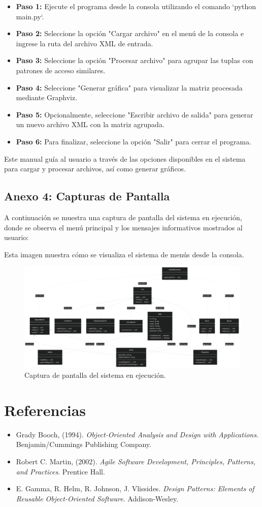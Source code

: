 \documentclass[letterpaper,12pt]{article}
\begin{document}
\begin{multicols}{2}
    \begin{itemize}
        \item \textbf{Paso 1:} Ejecute el programa desde la consola utilizando el comando `python main.py`.
        \item \textbf{Paso 2:} Seleccione la opción "Cargar archivo" en el menú de la consola e ingrese la ruta del archivo XML de entrada.
        \item \textbf{Paso 3:} Seleccione la opción "Procesar archivo" para agrupar las tuplas con patrones de acceso similares.
        \item \textbf{Paso 4:} Seleccione "Generar gráfica" para visualizar la matriz procesada mediante Graphviz.
        \item \textbf{Paso 5:} Opcionalmente, seleccione "Escribir archivo de salida" para generar un nuevo archivo XML con la matriz agrupada.
        \item \textbf{Paso 6:} Para finalizar, seleccione la opción "Salir" para cerrar el programa.
    \end{itemize}

    Este manual guía al usuario a través de las opciones disponibles en el sistema para cargar y procesar archivos, así como generar gráficos.

    \subsection*{Anexo 4: Capturas de Pantalla}
    A continuación se muestra una captura de pantalla del sistema en ejecución, donde se observa el menú principal y los mensajes informativos mostrados al usuario:

    Esta imagen muestra cómo se visualiza el sistema de menús desde la consola.

    \begin{figure}[H]
        \centering
        \includegraphics[width=0.2\columnwidth]{images/diagram.png}
        \caption{Captura de pantalla del sistema en ejecución.}
        \label{fig:diagram}
    \end{figure}


    \section*{Referencias}
    \begin{itemize}
        \item Grady Booch, (1994). \textit{Object-Oriented Analysis and Design with Applications}. Benjamin/Cummings Publishing Company.
        \item Robert C. Martin, (2002). \textit{Agile Software Development, Principles, Patterns, and Practices}. Prentice Hall.
        \item E. Gamma, R. Helm, R. Johnson, J. Vlissides. \textit{Design Patterns: Elements of Reusable Object-Oriented Software}. Addison-Wesley.
    \end{itemize}

\end{multicols}
\end{document}
